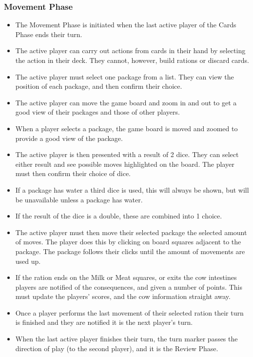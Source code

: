 	\subsubsection{Movement Phase}
	  \begin{itemize}
	  	\item \pA The Movement Phase is initiated when the last active player of the Cards Phase ends their turn.
	  	\item \pA The active player can carry out actions from cards in their hand by selecting the action in their deck. They cannot, however, build rations or discard cards.
	  	\item \pA The active player must select one package from a list. They can view the position of each package, and then confirm their choice.
	  	\item \pB The active player can move the game board and zoom in and out to get a good view of their packages and those of other players.
	  	\item \pA When a player selects a package, the game board is moved and zoomed to provide a good view of the package.
	  	\item \pA The active player is then presented with a result of 2 dice. They can select either result and see possible moves highlighted on the board. The player must then confirm their choice of dice.
	  	\item \pA If a package has water a third dice is used, this will always be shown, but will be unavailable unless a package has water.
	  	\item \pB If the result of the dice is a double, these are combined into 1 choice.
	  	\item \pA The active player must then move their selected package the selected amount of moves. The player does this by clicking on board squares adjacent to the package. The package follows their clicks until the amount of movements are used up.
	  	\item \pA If the ration ends on the Milk or Meat squares, or exits the cow intestines players are notified of the consequences, and given a number of points. This must update the players' scores, and the cow information straight away.
	  	\item \pA Once a player performs the last movement of their selected ration their turn is finished and they are notified it is the next player's turn.
	  	\item \pA When the last active player finishes their turn, the turn marker passes the direction of play (to the second player), and it is the Review Phase.
	  \end{itemize}
